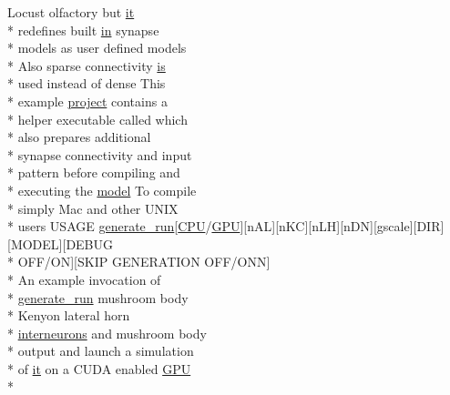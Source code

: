\begin{DoxyCompactItemize}
Locust olfactory but \hyperlink{userproject_2PoissonIzh__project_2README_8txt_a3e3bbb6c9b14c38757cf273a117e43e8}{it} \\*
redefines built \hyperlink{README_8txt_a148897a6b2cc9cff25af80abb13426b0}{in} synapse \\*
models as user defined models \\*
Also sparse connectivity \hyperlink{userproject_2MBody__userdef__project_2README_8txt_a7b4e6cf78d14ce882cb8ff127e01babd}{is} \\*
used instead of dense This \\*
example \hyperlink{userproject_2SynDelay__project_2README_8txt_a762c750134e07a31b7965860fd292b51}{project} contains a \\*
helper executable called which \\*
also prepares additional \\*
synapse connectivity and input \\*
pattern before compiling and \\*
executing the \hyperlink{README_8txt_a69fd801b7213948c12d9dd7eebb3ed14}{model} To compile \\*
simply Mac and other U\+N\+I\+X \\*
users U\+S\+A\+G\+E \hyperlink{userproject_2MBody__userdef__project_2README_8txt_a320a215d1e27b4de394be70e90d22863}{generate\+\_\+run}\mbox{[}\hyperlink{README_8txt_a74a069e3c75797de2636c4dd14daa147}{C\+P\+U}/\hyperlink{modelSpec_8h_a39cb9803524b6f3b783344b2f89867b4}{G\+P\+U}\mbox{]}\mbox{[}n\+A\+L\mbox{]}\mbox{[}n\+K\+C\mbox{]}\mbox{[}n\+L\+H\mbox{]}\mbox{[}n\+D\+N\mbox{]}\mbox{[}gscale\mbox{]}\mbox{[}D\+I\+R\mbox{]}\mbox{[}M\+O\+D\+E\+L\mbox{]}\mbox{[}D\+E\+B\+U\+G \\*
O\+F\+F/O\+N\mbox{]}\mbox{[}S\+K\+I\+P G\+E\+N\+E\+R\+A\+T\+I\+O\+N O\+F\+F/O\+N\+N\mbox{]} \\*
An example invocation of \\*
\hyperlink{userproject_2MBody__userdef__project_2README_8txt_a320a215d1e27b4de394be70e90d22863}{generate\+\_\+run} mushroom body \\*
Kenyon lateral horn \\*
\hyperlink{userproject_2SynDelay__project_2README_8txt_adf6327d22e2c11a62a22ab5afd4f2b81}{interneurons} and mushroom body \\*
output and launch a simulation \\*
of \hyperlink{userproject_2PoissonIzh__project_2README_8txt_a3e3bbb6c9b14c38757cf273a117e43e8}{it} on a C\+U\+D\+A enabled \hyperlink{modelSpec_8h_a39cb9803524b6f3b783344b2f89867b4}{G\+P\+U} \\*

\end{DoxyCompactItemize}
